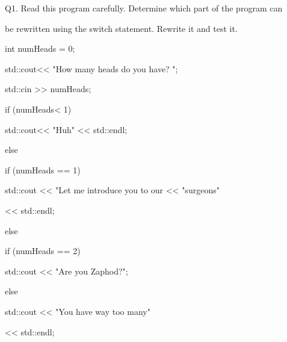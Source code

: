 Q1. Read this program carefully. Determine which part of the program can

be rewritten using the switch statement. Rewrite it and test it.

\begin{console}

int numHeads = 0;

std::cout<< "How many heads do you have? ";

std::cin >> numHeads;



if (numHeads< 1)

{

    std::cout<< "Huh" << std::endl;

}

else

{

     if (numHeads == 1)

     {

         std::cout << "Let me introduce you to our << "surgeons"

                   << std::endl;

     }

     else

     {

          if (numHeads == 2)

          {

              std::cout << "Are you Zaphod?";

          }

          else

          {

              std::cout << "You have way too many"

                       << std::endl;

          }

     }

}

\end{console}

